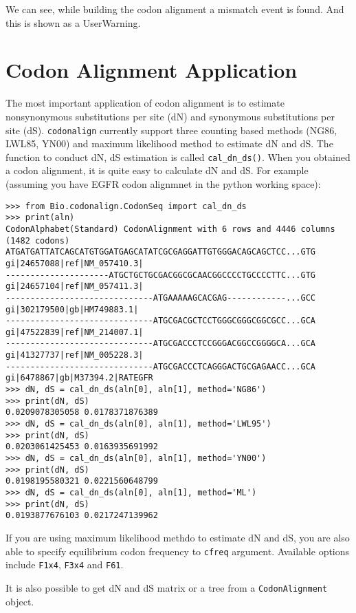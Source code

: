 We can see, while building the codon alignment a mismatch event is
found. And this is shown as a UserWarning.

\section{Codon Alignment Application}
\label{subsec:app}

The most important application of codon alignment is to estimate
nonsynonymous substitutions per site (dN) and synonymous substitutions
per site (dS). \verb|codonalign| currently support three counting
based methods (NG86, LWL85, YN00) and maximum likelihood method to
estimate dN and dS. The function to conduct dN, dS estimation is called
\verb|cal_dn_ds()|. When you obtained a codon alignment, it is quite
easy to calculate dN and dS. For example (assuming you have EGFR codon
alignmnet in the python working space):

\begin{verbatim}
>>> from Bio.codonalign.CodonSeq import cal_dn_ds
>>> print(aln)
CodonAlphabet(Standard) CodonAlignment with 6 rows and 4446 columns (1482 codons)
ATGATGATTATCAGCATGTGGATGAGCATATCGCGAGGATTGTGGGACAGCAGCTCC...GTG gi|24657088|ref|NM_057410.3|
---------------------ATGCTGCTGCGACGGCGCAACGGCCCCTGCCCCTTC...GTG gi|24657104|ref|NM_057411.3|
------------------------------ATGAAAAAGCACGAG------------...GCC gi|302179500|gb|HM749883.1|
------------------------------ATGCGACGCTCCTGGGCGGGCGGCGCC...GCA gi|47522839|ref|NM_214007.1|
------------------------------ATGCGACCCTCCGGGACGGCCGGGGCA...GCA gi|41327737|ref|NM_005228.3|
------------------------------ATGCGACCCTCAGGGACTGCGAGAACC...GCA gi|6478867|gb|M37394.2|RATEGFR
>>> dN, dS = cal_dn_ds(aln[0], aln[1], method='NG86')
>>> print(dN, dS)
0.0209078305058 0.0178371876389
>>> dN, dS = cal_dn_ds(aln[0], aln[1], method='LWL95')
>>> print(dN, dS)
0.0203061425453 0.0163935691992
>>> dN, dS = cal_dn_ds(aln[0], aln[1], method='YN00')
>>> print(dN, dS)
0.0198195580321 0.0221560648799
>>> dN, dS = cal_dn_ds(aln[0], aln[1], method='ML')
>>> print(dN, dS)
0.0193877676103 0.0217247139962
\end{verbatim}

If you are using maximum likelihood methdo to estimate dN and dS, you
are also able to specify equilibrium codon frequency to \texttt{cfreq}
argument. Available options include \texttt{F1x4}, \texttt{F3x4} and
\texttt{F61}.

It is also possible to get dN and dS matrix or a tree from a
\verb|CodonAlignment| object.

